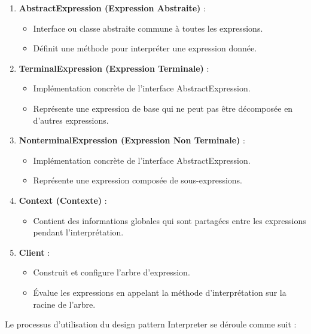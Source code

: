 \begin{enumerate}[leftmargin=*,labelsep=3mm]
    \item \textbf{AbstractExpression (Expression Abstraite)} :
    \begin{itemize}
        \item Interface ou classe abstraite commune à toutes les expressions.
        \item Définit une méthode pour interpréter une expression donnée.
    \end{itemize}
    
    \item \textbf{TerminalExpression (Expression Terminale)} :
    \begin{itemize}
        \item Implémentation concrète de l'interface AbstractExpression.
        \item Représente une expression de base qui ne peut pas être décomposée en d'autres expressions.
    \end{itemize}
    
    \item \textbf{NonterminalExpression (Expression Non Terminale)} :
    \begin{itemize}
        \item Implémentation concrète de l'interface AbstractExpression.
        \item Représente une expression composée de sous-expressions.
    \end{itemize}
    
    \item \textbf{Context (Contexte)} :
    \begin{itemize}
        \item Contient des informations globales qui sont partagées entre les expressions pendant l'interprétation.
    \end{itemize}
    
    \item \textbf{Client} :
    \begin{itemize}
        \item Construit et configure l'arbre d'expression.
        \item Évalue les expressions en appelant la méthode d'interprétation sur la racine de l'arbre.
    \end{itemize}
\end{enumerate}

Le processus d'utilisation du design pattern Interpreter se déroule comme suit :

